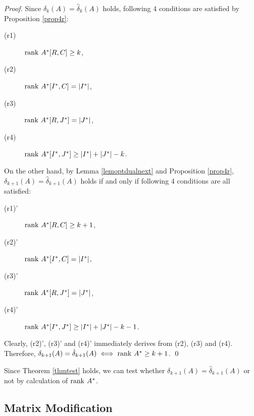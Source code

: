 \begin{proof}
Since $ \delta_k (A) = \hat{\delta}_{k} (A) $ holds, 
following 4 conditions are satisfied by Proposition \ref{prop4r}:
\begin{description}
\item[(r1)] $ \mathrm{rank} \  A^{\ast} [R,C] \ge k $,
\item[(r2)] $ \mathrm{rank} \  A^{\ast} [I^{\ast},C] = | I^{\ast} | $,
\item[(r3)] $ \mathrm{rank} \  A^{\ast} [R,J^{\ast}] = | J^{\ast} | $,
\item[(r4)] $ \mathrm{rank} \  A^{\ast} [I^{\ast} ,J^{\ast} ] \ge |I^{\ast} | + | J^{\ast} | - k  $.
\end{description}

On the other hand, by Lemma \ref{lemoptdualnext} and Proposition \ref{prop4r}, 
$ \delta_{k+1} (A) = \hat{\delta}_{k+1} (A) $ holds 
if and only if following 4 conditions are all satisfied:
\begin{description}
\item[(r1)'] $ \mathrm{rank} \  A^{\ast} [R,C] \ge k+1 $,
\item[(r2)'] $ \mathrm{rank} \  A^{\ast} [I^{\ast},C] = | I^{\ast} | $,
\item[(r3)'] $ \mathrm{rank} \  A^{\ast} [R,J^{\ast}] = | J^{\ast} | $,
\item[(r4)'] $ \mathrm{rank} \  A^{\ast} [I^{\ast} ,J^{\ast} ] \ge |I^{\ast} | + | J^{\ast} | - k -1 $.
\end{description}
Clearly, (r2)', (r3)' and (r4)' immediately derives from (r2), (r3) and (r4).
Therefore, $ \delta_{k+1} (A) = \hat{\delta}_{k+1} (A) \iff \mathrm{rank} \  A^{\ast} \ge k + 1 $. \qed
\end{proof}

Since Theorem \ref{thmtest} holds, 
we can test whether $ \delta_{k+1} (A) = \hat{\delta}_{k+1} (A) $ or not 
by calculation of $ \mathrm{rank} \  A^{\ast}$. 



\subsection{Matrix Modification}
\label{mod}

